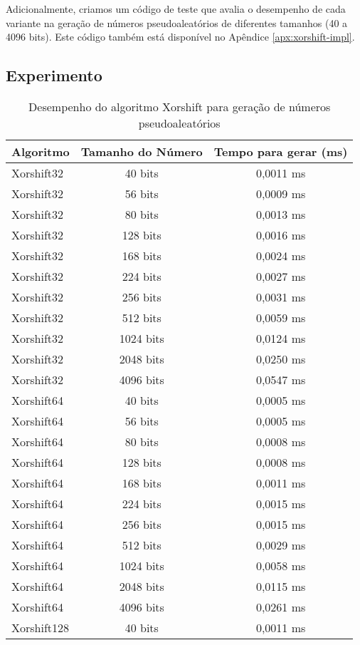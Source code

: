 Adicionalmente, criamos um código de teste que avalia o desempenho de cada variante na geração de números pseudoaleatórios de diferentes tamanhos (40 a 4096 bits). Este código também está disponível no Apêndice \ref{apx:xorshift-impl}.

\subsection{Experimento}

\begin{table}[H]
\centering
\caption{Desempenho do algoritmo Xorshift para geração de números pseudoaleatórios}
\label{tab:xorshift-performance}
\begin{tabular}{|l|c|c|}
\hline
\textbf{Algoritmo} & \textbf{Tamanho do Número} & \textbf{Tempo para gerar (ms)} \\
\hline
Xorshift32 & 40 bits & 0,0011 ms \\
Xorshift32 & 56 bits & 0,0009 ms \\
Xorshift32 & 80 bits & 0,0013 ms \\
Xorshift32 & 128 bits & 0,0016 ms \\
Xorshift32 & 168 bits & 0,0024 ms \\
Xorshift32 & 224 bits & 0,0027 ms \\
Xorshift32 & 256 bits & 0,0031 ms \\
Xorshift32 & 512 bits & 0,0059 ms \\
Xorshift32 & 1024 bits & 0,0124 ms \\
Xorshift32 & 2048 bits & 0,0250 ms \\
Xorshift32 & 4096 bits & 0,0547 ms \\
\hline
Xorshift64 & 40 bits & 0,0005 ms \\
Xorshift64 & 56 bits & 0,0005 ms \\
Xorshift64 & 80 bits & 0,0008 ms \\
Xorshift64 & 128 bits & 0,0008 ms \\
Xorshift64 & 168 bits & 0,0011 ms \\
Xorshift64 & 224 bits & 0,0015 ms \\
Xorshift64 & 256 bits & 0,0015 ms \\
Xorshift64 & 512 bits & 0,0029 ms \\
Xorshift64 & 1024 bits & 0,0058 ms \\
Xorshift64 & 2048 bits & 0,0115 ms \\
Xorshift64 & 4096 bits & 0,0261 ms \\
\hline
Xorshift128 & 40 bits & 0,0011 ms \\

\end{tabular}
\end{table}
